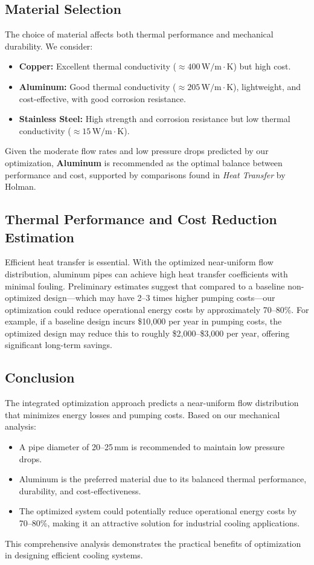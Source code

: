 \documentclass{article}
\begin{document}
\subsection{Material Selection}
The choice of material affects both thermal performance and mechanical durability. We consider:
\begin{itemize}
    \item \textbf{Copper:} Excellent thermal conductivity (\(\approx 400\,\mathrm{W/m\cdot K}\)) but high cost.
    \item \textbf{Aluminum:} Good thermal conductivity (\(\approx 205\,\mathrm{W/m\cdot K}\)), lightweight, and cost-effective, with good corrosion resistance.
    \item \textbf{Stainless Steel:} High strength and corrosion resistance but low thermal conductivity (\(\approx 15\,\mathrm{W/m\cdot K}\)).
\end{itemize}
Given the moderate flow rates and low pressure drops predicted by our optimization, \textbf{Aluminum} is recommended as the optimal balance between performance and cost, supported by comparisons found in \textit{Heat Transfer} by Holman.

\subsection{Thermal Performance and Cost Reduction Estimation}
Efficient heat transfer is essential. With the optimized near-uniform flow distribution, aluminum pipes can achieve high heat transfer coefficients with minimal fouling. Preliminary estimates suggest that compared to a baseline non-optimized design—which may have 2–3 times higher pumping costs—our optimization could reduce operational energy costs by approximately 70–80\%. For example, if a baseline design incurs \$10,000 per year in pumping costs, the optimized design may reduce this to roughly \$2,000–\$3,000 per year, offering significant long-term savings.

\subsection{Conclusion}
The integrated optimization approach predicts a near-uniform flow distribution that minimizes energy losses and pumping costs. Based on our mechanical analysis:
\begin{itemize}
    \item A pipe diameter of 20–25\,mm is recommended to maintain low pressure drops.
    \item Aluminum is the preferred material due to its balanced thermal performance, durability, and cost-effectiveness.
    \item The optimized system could potentially reduce operational energy costs by 70–80\%, making it an attractive solution for industrial cooling applications.
\end{itemize}
This comprehensive analysis demonstrates the practical benefits of optimization in designing efficient cooling systems.
\end{document}
